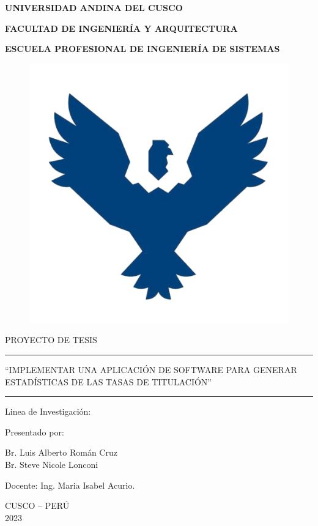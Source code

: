 \begin{titlepage}
	\begin{center}
		{\LARGE \textbf{UNIVERSIDAD ANDINA DEL CUSCO}}
		
		\vspace{0.5cm}
		{\large \textbf{FACULTAD DE INGENIERÍA Y ARQUITECTURA}}
		
		\vspace{0.5cm}		
		{\large \textbf{ESCUELA PROFESIONAL DE INGENIERÍA DE SISTEMAS}}
		\begin{figure}[h]
			\centering	
			\includegraphics[scale=0.40]{imagenes/logo.png}		
		\end{figure}
		
		{\large {PROYECTO DE TESIS}}
		
		\rule{163mm}{0.3mm}		
		
		
		\begin{spacing}{1}
			{\large ``IMPLEMENTAR UNA APLICACIÓN DE SOFTWARE PARA GENERAR ESTADÍSTICAS DE LAS TASAS DE TITULACIÓN''}
		\end{spacing} 
		
		
		\rule{163mm}{0.3mm}
		
		\vspace{0.5cm}
		
		{\large {Linea de Investigación: }}
		\vspace{0.5cm}
		
		{\large {Presentado por:}}		
		
		{\large {Br. Luis Alberto Román Cruz	}}\\
		{\large {Br. Steve Nicole Lonconi	}}
		\vspace{0.5cm}
		
		{\large {Docente: Ing. Maria Isabel Acurio.}}
		\vspace{0.5cm}
		
		{\large {CUSCO – PERÚ }}\\
		{\large {2023 }}
		\vspace{0.5cm}
		
		
	\end{center}
\end{titlepage}
